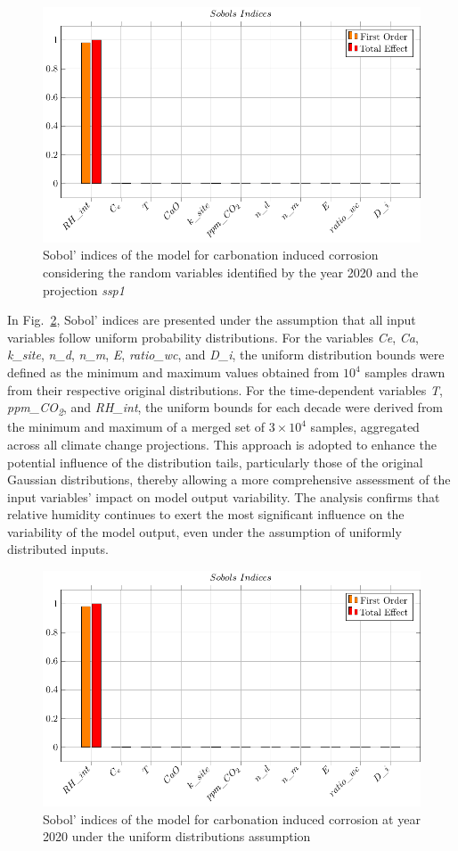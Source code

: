 \begin{figure}[H]
    \centering
    \includegraphics[width=0.8\linewidth]{imgs/pdfs/sobols_indices/carbonation/17_sobols_2020_ssp1.pdf}
    \caption{Sobol' indices of the model for carbonation induced corrosion considering the random variables identified by the year 2020 and the projection \textit{ssp1}}\label{Sobol_carb_2020ssp1}
\end{figure}
In Fig.~\ref{Sobol_carb_2020uniform}, Sobol' indices are presented under the assumption that all input variables follow uniform probability distributions. For the variables \textit{Ce}, \textit{Ca}, \textit{k\_site}, \textit{n\_d}, \textit{n\_m}, \textit{E}, \textit{ratio\_wc}, and \textit{D\_i}, the uniform distribution bounds were defined as the minimum and maximum values obtained from $10^4$ samples drawn from their respective original distributions. For the time-dependent variables \textit{T}, \textit{ppm\_CO\textsubscript{2}}, and \textit{RH\_int}, the uniform bounds for each decade were derived from the minimum and maximum of a merged set of $3 \times 10^4$ samples, aggregated across all climate change projections. This approach is adopted to enhance the potential influence of the distribution tails, particularly those of the original Gaussian distributions, thereby allowing a more comprehensive assessment of the input variables' impact on model output variability. 
The analysis confirms that relative humidity continues to exert the most significant influence on the variability of the model output, even under the assumption of uniformly distributed inputs.
\begin{figure}[H]
    \centering
    \includegraphics[width=0.8\linewidth]{imgs/pdfs/sobols_indices/carbonation/17_sobols_2020_ssp1.pdf}
    \caption{Sobol' indices of the model for carbonation induced corrosion at year 2020 under the uniform distributions assumption}\label{Sobol_carb_2020uniform}
\end{figure}

